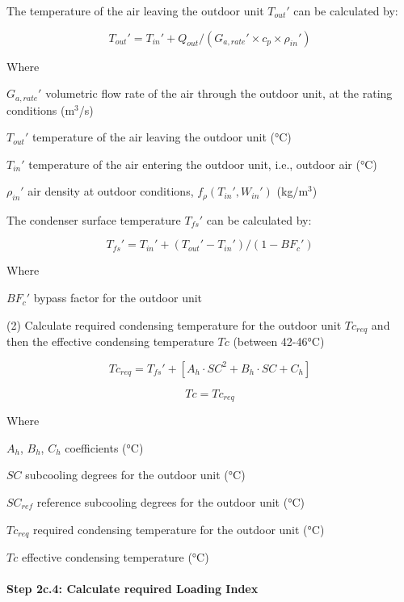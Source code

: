 The temperature of the air leaving the outdoor unit ${T_{out}}'$ can be calculated by:
 
\begin{equation}{T_{out}}'={T_{in}}'+Q_{out}/({G_{a,rate}}'\times{c_p}\times{{\rho_{in}}'})\end{equation}
 
Where

${G_{a,rate}}'$ volumetric flow rate of the air through the outdoor unit, at the rating conditions (m\(^3\)/s)

${T_{out}}'$ temperature of the air leaving the outdoor unit (°C)

${T_{in}}'$	temperature of the air entering the outdoor unit, i.e., outdoor air (°C)

${\rho_{in}}'$ air density at outdoor conditions, $f_{\rho}({T_{in}}',{W_{in}}')$ (kg/m\(^3\))

The condenser surface temperature ${T_{fs}}'$ can be calculated by:
 
\begin{equation}{T_{fs}}'={T_{in}}'+({T_{out}}'-{T_{in}}')/(1-{BF_c}')\end{equation}
 
Where

${BF_c}'$ 	bypass factor for the outdoor unit  

(2) Calculate required condensing temperature for the outdoor unit $Tc_{req}$ and then the effective condensing temperature $Tc$ (between 42-46°C)
 
\begin{equation}Tc_{req}={T_{fs}}'+[A_h\cdot SC^2+B_h\cdot SC+C_h]\end{equation}

\begin{equation}Tc=Tc_{req}\end{equation}

Where	

$A_h$, $B_h$, $C_h$ coefficients (°C)

$SC$ subcooling degrees for the outdoor unit (°C)

$SC_{ref}$ reference subcooling degrees for the outdoor unit (°C)

$Tc_{req}$ required condensing temperature for the outdoor unit (°C)

$Tc$ effective condensing temperature (°C)

\paragraph{Step 2c.4: Calculate required Loading Index}\label{step-2c.4:-calculate-required-loading-index}

